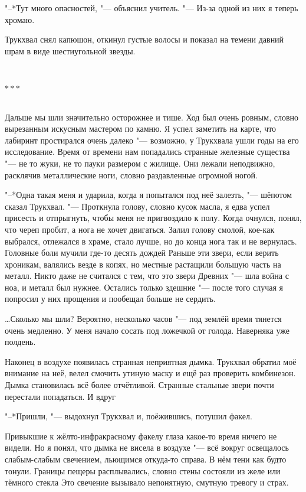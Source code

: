 \documentclass[a4paper,10pt,fleqn]{book}
\newcommand{\ldotst}{\so{...}\xspace}
\newcommand{\razd}{~\\{\centering\Large\bfseries$\ast \ast \ast$\par}~\\}
\begin{document}
"--*Тут много опасностей, "--- объяснил учитель.
"--- Из-за одной из них я теперь хромаю.

Трукхвал снял капюшон, откинул густые волосы и показал на темени давний шрам в виде шестиугольной звезды.

\razd

Дальше мы шли значительно осторожнее и тише.
Ход был очень ровным, словно вырезанным искусным мастером по камню.
Я успел заметить на карте, что лабиринт простирался очень далеко "--- возможно, у Трукхвала ушли годы на его исследование.
Время от времени нам попадались странные железные существа "--- не то жуки, не то пауки размером с жилище.
Они лежали неподвижно, расклячив металлические ноги, словно раздавленные огромной ногой.

"--*Одна такая меня и ударила, когда я попытался под неё залезть, "--- шёпотом сказал Трукхвал.
"--- Проткнула голову, словно кусок масла, я едва успел присесть и отпрыгнуть, чтобы меня не пригвоздило к полу.
Когда очнулся, понял, что череп пробит, а нога не хочет двигаться.
Залил голову смолой, кое-как выбрался, отлежался в храме, стало лучше, но до конца нога так и не вернулась.
Головные боли мучили где-то десять дождей\ldotst
Раньше эти звери, если верить хроникам, валялись везде в копях, но местные растащили большую часть на металл.
Никто даже не считался с тем, что это звери Древних "--- шла война с ноа, и металл был нужнее.
Остались только здешние "--- после того случая я попросил у них прощения и пообещал больше не сердить.

\dots Сколько мы шли?
Вероятно, несколько часов "--- под землёй время тянется очень медленно.
У меня начало сосать под ложечкой от голода.
Наверняка уже полдень.

Наконец в воздухе появилась странная неприятная дымка.
Трукхвал обратил моё внимание на неё, велел смочить утиную маску и ещё раз проверить комбинезон.
Дымка становилась всё более отчётливой.
Странные стальные звери почти перестали попадаться.
И вдруг\ldotst

"--*Пришли, "--- выдохнул Трукхвал и, поёжившись, потушил факел.

Привыкшие к жёлто-инфракрасному факелу глаза какое-то время ничего не видели.
Но я понял, что дымка не висела в воздухе "--- всё вокруг освещалось слабым-слабым свечением, льющимся откуда-то справа.
В нём тени как будто тонули.
Границы пещеры расплывались, словно стены состояли из желе или тёмного стекла\ldotst
Это свечение вызывало непонятную, смутную тревогу и страх.
\end{document}
